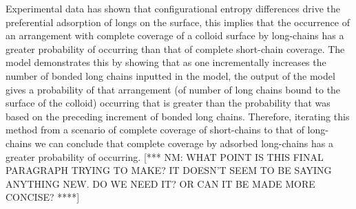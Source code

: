 \documentclass[journal=mamobx,manuscript=article]{achemso}
\begin{document}



Experimental data has shown that configurational entropy differences drive the preferential adsorption of longs on the surface, this implies that the occurrence of an arrangement with complete coverage of a colloid surface by long-chains has a greater probability of occurring than that of complete short-chain coverage. The model demonstrates this by showing that as one incrementally increases the number of bonded long chains inputted in the model, the output of the model gives a probability of that arrangement (of number of long chains bound to the surface of the colloid) occurring that is greater than the probability that was based on the preceding increment of bonded long chains. Therefore, iterating this method from a scenario of complete coverage of short-chains to that of long-chains we can conclude that complete coverage by adsorbed long-chains has a greater probability of occurring.
[*** NM:  WHAT POINT IS THIS FINAL PARAGRAPH TRYING TO MAKE?  IT DOESN'T SEEM TO BE SAYING ANYTHING NEW.  DO WE NEED IT? 
OR CAN IT BE MADE MORE CONCISE?  ****]

\end{document}
